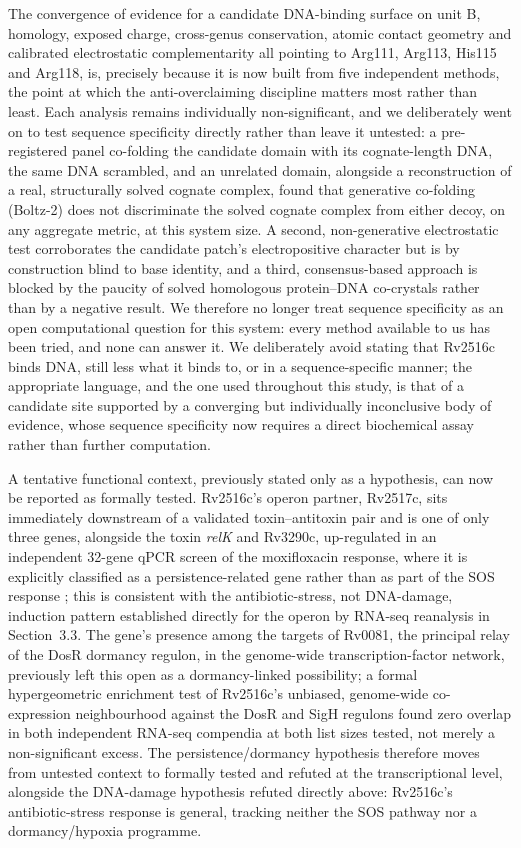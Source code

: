 \documentclass[11pt,a4paper]{article}
\begin{document}
The convergence of evidence for a candidate DNA-binding surface on unit B, homology, exposed
charge, cross-genus conservation, atomic contact geometry and calibrated electrostatic
complementarity all pointing to Arg111, Arg113,
His115 and Arg118, is, precisely because it is now built from five independent methods, the point
at which the anti-overclaiming discipline matters most rather than least. Each analysis remains
individually non-significant, and we deliberately went on to test sequence specificity directly
rather than leave it untested: a pre-registered panel co-folding the candidate domain with its
cognate-length DNA, the same DNA scrambled, and an unrelated domain, alongside a reconstruction of a
real, structurally solved cognate complex, found that generative co-folding (Boltz-2) does not
discriminate the solved cognate complex from either decoy, on any aggregate metric, at this system
size. A second, non-generative electrostatic test corroborates the candidate patch's electropositive
character but is by construction blind to base identity, and a third, consensus-based approach is
blocked by the paucity of solved homologous protein--DNA co-crystals rather than by a negative
result. We therefore no longer treat sequence specificity as an open computational question for this
system: every method available to us has been tried, and none can answer it. We deliberately
avoid stating that Rv2516c binds DNA, still less what it binds to, or in a sequence-specific manner;
the appropriate language, and the
one used throughout this study, is that of a candidate site supported by a converging but
individually inconclusive body of evidence, whose sequence specificity now requires a direct
biochemical assay rather than further computation.

A tentative functional context, previously stated only as a hypothesis, can now be reported as
formally tested. Rv2516c's operon partner, Rv2517c, sits immediately downstream of
a validated toxin--antitoxin pair and is one of only three genes, alongside the toxin \textit{relK}
and Rv3290c, up-regulated in an independent 32-gene qPCR screen of the moxifloxacin response, where
it is explicitly classified as a persistence-related gene rather than as part of the SOS response
\citep{iacobino2021moxifloxacin}; this is consistent with the antibiotic-stress, not DNA-damage,
induction pattern established directly for the operon by RNA-seq reanalysis in Section~3.3. The
gene's presence among the targets of Rv0081, the principal relay of the DosR dormancy regulon, in
the genome-wide transcription-factor network, previously left this open as a dormancy-linked
possibility; a formal hypergeometric enrichment test of Rv2516c's unbiased, genome-wide
co-expression neighbourhood against the DosR and SigH regulons found zero overlap in both
independent RNA-seq compendia at both list sizes tested, not merely a non-significant excess. The
persistence/dormancy hypothesis therefore moves from untested context to formally tested and
refuted at the transcriptional level, alongside the DNA-damage hypothesis refuted directly above:
Rv2516c's antibiotic-stress response is general, tracking neither the SOS pathway nor a
dormancy/hypoxia programme.
\end{document}
